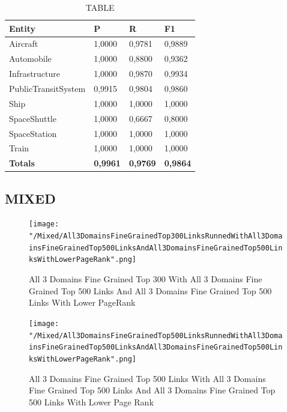 \documentclass[thesis=M,english]{FITthesis}[2018/05/30]
\begin{document}
	
	\begin{table}[H]\centering
		\caption{TABLE}
		\label{}
		\begin{tabular}{|l|l|l|l|}
			\hline {\textbf{Entity}} & {\textbf{P}} & {\textbf{R}} & {\textbf{F1}}\\\hline
				Aircraft & 1,0000 & 0,9781 & 0,9889\\
				Automobile & 1,0000 & 0,8800 & 0,9362\\				
				Infrastructure & 1,0000 & 0,9870 & 0,9934\\
				PublicTransitSystem & 0,9915 & 0,9804 & 0,9860\\
				Ship & 1,0000 & 1,0000 & 1,0000\\				
				SpaceShuttle & 1,0000 & 0,6667 & 0,8000\\
				SpaceStation & 1,0000 & 1,0000 & 1,0000\\
				Train & 1,0000 & 1,0000 & 1,0000\\\hline
				\textbf{Totals} & \textbf{0,9961} & \textbf{0,9769} & \textbf{0,9864}\\\hline
		\end{tabular}
	\end{table}	
		
	\subsection{MIXED}
		
	\begin{figure}[H]\centering
		\texttt{[image: "/Mixed/All3DomainsFineGrainedTop300LinksRunnedWithAll3DomainsFineGrainedTop500LinksAndAll3DomainsFineGrainedTop500LinksWithLowerPageRank".png]}
		\caption{All 3 Domains Fine Grained Top 300 With All 3 Domains Fine Grained Top 500 Links And All 3 Domains Fine Grained Top 500 Links With Lower PageRank}\label{}
	\end{figure}
	
	\begin{figure}
		\texttt{[image: "/Mixed/All3DomainsFineGrainedTop500LinksRunnedWithAll3DomainsFineGrainedTop500LinksAndAll3DomainsFineGrainedTop500LinksWithLowerPageRank".png]}		\caption{All 3 Domains Fine Grained Top 500 Links  With All 3 Domains Fine Grained Top 500 Links And All 3 Domains Fine Grained Top 500 Links With Lower Page Rank}
	\end{figure}
\end{document}
